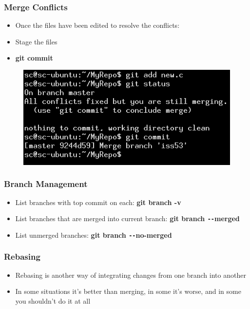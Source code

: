 \documentclass{beamer}
\begin{document}
\begin{frame}
	\frametitle{Merge Conflicts}
	\begin{itemize}
		\item{Once the files have been edited to resolve the conflicts:}
		\item{Stage the files}
		\item{\textbf{git commit}}
	\end{itemize}
	\begin{figure}
		\includegraphics[scale=0.5]{Merging_Branches-12.png}
	\end{figure}
\end{frame}

\begin{frame}
	\frametitle{Branch Management}
	\begin{itemize}
		\item{List branches with top commit on each: \textbf{git branch -v}}
		\item{List branches that are merged into current branch: \textbf{git branch \texttt{-{}-}merged}}
		\item{List unmerged branches: \textbf{git branch \texttt{-{}-}no-merged}}
	\end{itemize}
\end{frame}

\begin{frame}
	\frametitle{Rebasing}
	\begin{itemize}
		\item{Rebasing is another way of integrating changes from one branch into another}
		\item{In some situations it's better than merging, in some it's worse, and in some you shouldn't do it at all}
	\end{itemize}
\end{frame}
\end{document}
